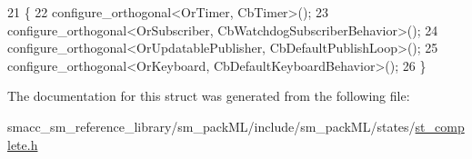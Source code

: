 \begin{DoxyCode}
21     \{
22         configure\_orthogonal<OrTimer, CbTimer>();   
23         configure\_orthogonal<OrSubscriber, CbWatchdogSubscriberBehavior>();
24         configure\_orthogonal<OrUpdatablePublisher, CbDefaultPublishLoop>();
25         configure\_orthogonal<OrKeyboard, CbDefaultKeyboardBehavior>();
26     \}
\end{DoxyCode}


The documentation for this struct was generated from the following file\+:\begin{DoxyCompactItemize}
\item 
smacc\+\_\+sm\+\_\+reference\+\_\+library/sm\+\_\+pack\+M\+L/include/sm\+\_\+pack\+M\+L/states/\hyperlink{st__complete_8h}{st\+\_\+complete.\+h}\end{DoxyCompactItemize}
